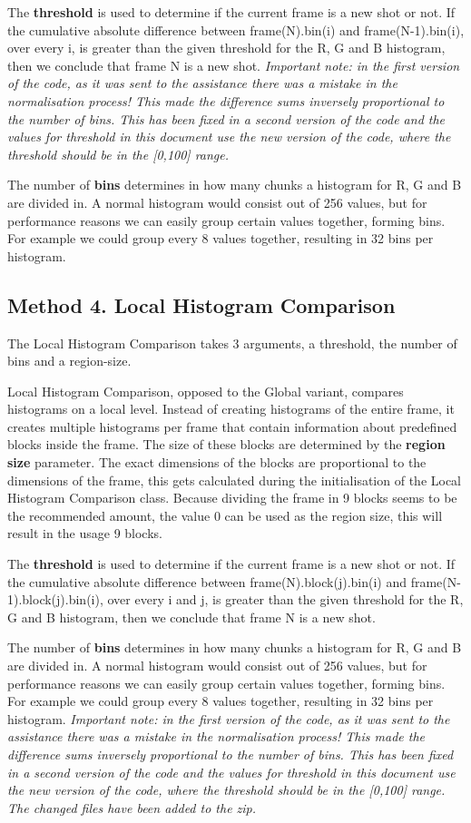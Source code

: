 \documentclass[a4paper,10pt]{article}
\begin{document}
The \textbf{threshold} is used to determine if the current frame is a new shot or not. If the cumulative absolute difference between frame(N).bin(i) and frame(N-1).bin(i), over every i, is greater than the given threshold for the R, G and B histogram, then we conclude that frame N is a new shot.
\textit{Important note: in the first version of the code, as it was sent to the assistance there was a mistake in the normalisation process! This made the difference sums inversely proportional to the number of bins. This has been fixed in a second version of the code and the values for threshold in this document use the new version of the code, where the threshold should be in the [0,100] range.}

The number of \textbf{bins} determines in how many chunks a histogram for R, G and B are divided in. A normal histogram would consist out of 256 values, but for performance reasons we can easily group certain values together, forming bins. For example we could group every 8 values together, resulting in 32 bins per histogram.

\subsection{Method 4. Local Histogram Comparison}
The Local Histogram Comparison takes 3 arguments, a threshold, the number of bins and a region-size.

Local Histogram Comparison, opposed to the Global variant, compares histograms on a local level. Instead of creating histograms of the entire frame, it creates multiple histograms per frame that contain information about predefined blocks inside the frame. The size of these blocks are determined by the \textbf{region size} parameter. The exact dimensions of the blocks are proportional to the dimensions of the frame, this gets calculated during the initialisation of the Local Histogram Comparison class. Because dividing the frame in 9 blocks seems to be the recommended amount, the value 0 can be used as the region size, this will result in the usage 9 blocks.

The \textbf{threshold} is used to determine if the current frame is a new shot or not. If the cumulative absolute difference between frame(N).block(j).bin(i) and frame(N-1).block(j).bin(i), over every i and j, is greater than the given threshold for the R, G and B histogram, then we
conclude that frame N is a new shot.

The number of \textbf{bins} determines in how many chunks a histogram for R, G and B are divided in. A normal histogram would consist out of 256 values, but for performance reasons we can easily group certain values together, forming bins. For example we could group every 8 values together, resulting in 32 bins per histogram.
\textit{Important note: in the first version of the code, as it was sent to the assistance there was a mistake in the normalisation process! This made the difference sums inversely proportional to the number of bins. This has been fixed in a second version of the code and the values for threshold in this document use the new version of the code, where the threshold should be in the [0,100] range. The changed files have been added to the zip.}
\end{document}
